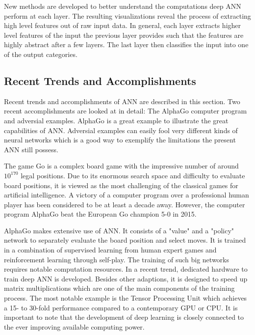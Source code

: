 New methods are developed to better understand the computations deep ANN perform at each layer. The resulting visualizations reveal the process of extracting high level features out of raw input data\cite{mordvintsev2015}\cite{yosinski2015understanding}. In general, each layer extracts higher level features of the input the previous layer provides such that the features are highly abstract after a few layers. The last layer then classifies the input into one of the output categories.

\subsection{Recent Trends and Accomplishments}\label{subsec:trends}
\label{sec:Recent_trends}

Recent trends and accomplishments of ANN are described in this section. Two recent accomplishments are looked at in detail: The AlphaGo computer program and adversial examples. AlphaGo is a great example to illustrate the great capabilities of ANN. Adversial examples can easily fool very different kinds of neural networks which is a good way to exemplify the limitations the present ANN still possess.

The game Go is a complex board game with the impressive number of around $10^{170}$ legal positions\cite{tromp2006combinatorics}. Due to its enormous search space and difficulty to evaluate board positions, it is viewed as the most challenging of the classical games for artificial intelligence. A victory of a computer program over a professional human player has been considered to be at least a decade away. However, the computer program AlphaGo beat the European Go champion 5-0 in 2015\cite{silver2016mastering}.

AlphaGo makes extensive use of ANN. It consists of a "value" and a "policy" network to separately evaluate the board position and select moves. It is trained in a combination of supervised learning from human expert games and reinforcement learning through self-play. The training of such big networks requires notable computation resources. In a recent trend, dedicated hardware to train deep ANN is developed. Besides other adaptions, it is designed to speed up matrix multiplications which are one of the main components of the training process. The most notable example is the Tensor Processing Unit which achieves a 15- to 30-fold performance compared to a contemporary GPU or CPU\cite{jouppi2017datacenter}. It is important to note that the development of deep learning is closely connected to the ever improving available computing power\cite{chen2016evolution}.

